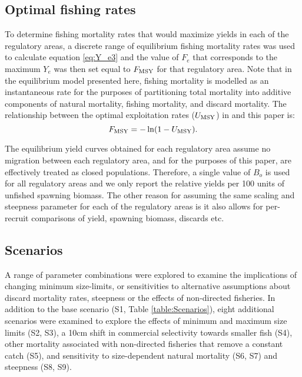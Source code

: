 \subsection*{Optimal fishing rates} %
\label{sub:optimal_fishing_rates}
To determine fishing mortality rates that would maximize yields in each of the regulatory areas, a discrete range of equilibrium fishing mortality rates was used to calculate equation \eqref{eq:Y_e3} and the value of $F_e$ that corresponds to the maximum $Y_e$ was then set equal to $F_{\rm{MSY}}$ for that regulatory area.  Note that in the equilibrium model presented here, fishing mortality is modelled as an instantaneous rate for the purposes of partitioning total mortality  into additive components of natural mortality, fishing mortality, and discard mortality.  The relationship between the optimal  exploitation rates ($U_{\rm{MSY}}$) in \cite{clark2006assessment} and this paper is:
\[
F_{\rm{MSY}} = -\ln(1-U_{\rm{MSY}}).
\]


The equilibrium yield curves obtained for each regulatory area assume no migration between each regulatory area, and for the purposes of this paper, are effectively treated as closed populations.  Therefore, a single value of $B_o$ is used for all regulatory areas and we only report the relative yields per 100 units of unfished spawning biomass.  The other reason for assuming the same scaling and steepness parameter for each of the regulatory areas is it also allows for per-recruit comparisons of yield, spawning biomass, discards etc.


\subsection*{Scenarios} %
\label{sub:scenarios}

A range of parameter combinations were explored to examine the implications of changing minimum size-limits, or sensitivities to alternative assumptions about discard mortality rates, steepness or the effects of non-directed fisheries.  In addition to the base scenario (S1, Table \ref{table:Scenarios}), eight additional scenarios were examined to explore the effects of minimum and maximum size limits (S2, S3), a 10cm shift in commercial selectivity towards smaller fish (S4), other mortality associated with non-directed fisheries that remove a constant catch (S5), and sensitivity to size-dependent natural mortality (S6, S7) and steepness (S8, S9).



